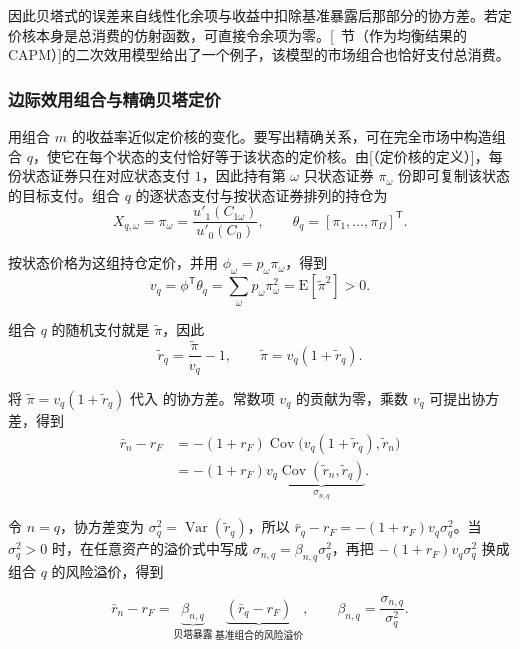 因此贝塔式的误差来自线性化余项与收益中扣除基准暴露后那部分的协方差。若定价核本身是总消费的仿射函数，可直接令余项为零。[~节（作为均衡结果的 CAPM）]的二次效用模型给出了一个例子，该模型的市场组合也恰好支付总消费。

\subsubsection{边际效用组合与精确贝塔定价}
 用组合 $m$ 的收益率近似定价核的变化。要写出精确关系，可在完全市场中构造组合 $q$，使它在每个状态的支付恰好等于该状态的定价核。由[（定价核的定义）]，每份状态证券只在对应状态支付 $1$，因此持有第 $\omega$ 只状态证券 $\pi_\omega$ 份即可复制该状态的目标支付。组合 $q$ 的逐状态支付与按状态证券排列的持仓为
\[
 X_{q,\omega}=\pi_\omega=\frac{u'_1(C_{1\omega})}{u'_0(C_0)},\qquad
 \theta_q=[\pi_1,\ldots,\pi_\Omega]^{\mathsf T}.
\]

按状态价格为这组持仓定价，并用 $\phi_\omega=p_\omega\pi_\omega$，得到
\[
 v_q=\phi^{\mathsf T}\theta_q
 =\sum_\omega p_\omega\pi_\omega^2
 =\mathrm E[\widetilde\pi^2]>0.
\]

组合 $q$ 的随机支付就是 $\widetilde\pi$，因此
\[
 \tilde r_q=\frac{\widetilde\pi}{v_q}-1,\qquad
 \widetilde\pi=v_q(1+\tilde r_q).
\]

将 $\widetilde\pi=v_q(1+\tilde r_q)$ 代入 的协方差。常数项 $v_q$ 的贡献为零，乘数 $v_q$ 可提出协方差，得到
\[
 \begin{aligned}
 \bar r_n-r_F&=-(1+r_F)\operatorname{Cov}\bigl(v_q(1+\tilde r_q),\tilde r_n\bigr)\\
 & =-(1+r_F)v_q\underbrace{\operatorname{Cov}(\tilde r_n,\tilde r_q)}_{\sigma_{n,q}}.
 \end{aligned}
\]

令 $n=q$，协方差变为 $\sigma_q^2=\operatorname{Var}(\tilde r_q)$，所以 $\bar r_q-r_F=-(1+r_F)v_q\sigma_q^2$。当 $\sigma_q^2>0$ 时，在任意资产的溢价式中写成 $\sigma_{n,q}=\beta_{n,q}\sigma_q^2$，再把 $-(1+r_F)v_q\sigma_q^2$ 换成组合 $q$ 的风险溢价，得到
\begin{tcolorbox}[knowledge,title=精确贝塔定价]
\begin{equation}
 \bar r_n-r_F=
 \underbrace{\beta_{n,q}}_{\text{贝塔暴露}}\,
 \underbrace{(\bar r_q-r_F)}_{\text{基准组合的风险溢价}},\qquad
 \beta_{n,q}=\frac{\sigma_{n,q}}{\sigma_q^2}.
 \label{eq:wj-10-25}
\end{equation}
\end{tcolorbox}

